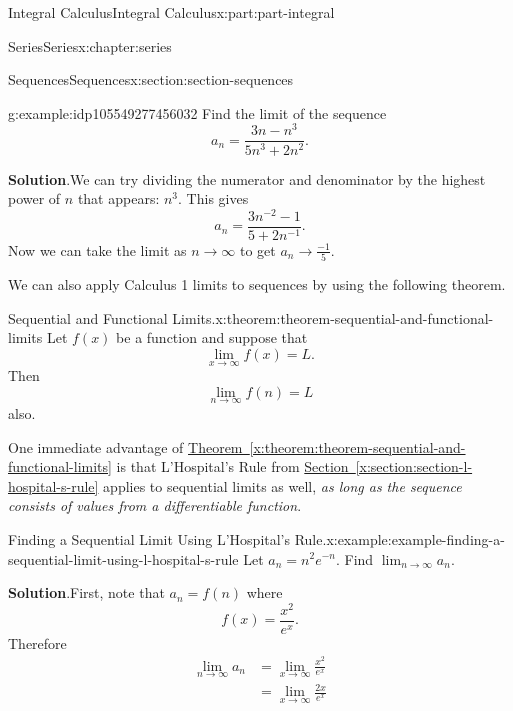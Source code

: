 \documentclass[twoside,10pt,]{book}
\newcommand{\blocktitlefont}{\relax}
\newcommand{\xreffont}{\relax}
\numberwithin{equation}{part}
\newcommand{\amp}{&}
\begin{document}
\begin{partptx}{Integral Calculus}{}{Integral Calculus}{}{}{x:part:part-integral}
\begin{chapterptx}{Series}{}{Series}{}{}{x:chapter:series}
\begin{sectionptx}{Sequences}{}{Sequences}{}{}{x:section:section-sequences}
\begin{example}{}{g:example:idp105549277456032}
Find the limit of the sequence%
\begin{equation*}
a_{n} = \frac{3n - n^{3}}{5n^{3} + 2n^{2}}.
\end{equation*}
%
\par\smallskip%
\noindent\textbf{\blocktitlefont Solution}.\hypertarget{g:solution:idp105549277456928}{}\quad{}We can try dividing the numerator and denominator by the highest power of \(n\) that appears: \(n^{3}\). This gives%
\begin{equation*}
a_{n} = \frac{3n^{-2} - 1}{5 + 2n^{-1}}\text{.}
\end{equation*}
Now we can take the limit as \(n\to\infty\) to get \(a_{n}\to\frac{-1}{5}\).%
\end{example}
We can also apply Calculus 1 limits to sequences by using the following theorem.%
\begin{theorem}{Sequential and Functional Limits.}{}{x:theorem:theorem-sequential-and-functional-limits}%
Let \(f(x)\) be a function and suppose that%
\begin{equation*}
\lim_{x\to\infty}f(x) = L\text{.}
\end{equation*}
Then%
\begin{equation*}
\lim_{n\to\infty}f(n) = L
\end{equation*}
also.%
\end{theorem}
One immediate advantage of \hyperref[x:theorem:theorem-sequential-and-functional-limits]{Theorem~{\xreffont\ref{x:theorem:theorem-sequential-and-functional-limits}}} is that L'Hospital's Rule from \hyperref[x:section:section-l-hospital-s-rule]{Section~{\xreffont\ref{x:section:section-l-hospital-s-rule}}} applies to sequential limits as well, \emph{as long as the sequence consists of values from a differentiable function}.%
\begin{example}{Finding a Sequential Limit Using L'Hospital's Rule.}{x:example:example-finding-a-sequential-limit-using-l-hospital-s-rule}%
Let \(a_{n} = n^{2}e^{-n}\). Find \(\lim_{n\to\infty}a_{n}\).%
\par\smallskip%
\noindent\textbf{\blocktitlefont Solution}.\hypertarget{g:solution:idp105549277464864}{}\quad{}First, note that \(a_{n} = f(n)\) where%
\begin{equation*}
f(x) = \frac{x^{2}}{e^{x}}\text{.}
\end{equation*}
Therefore%
%
\begin{align*}
\lim_{n\to\infty}a_{n} \amp = \lim_{x\to\infty}\frac{x^{2}}{e^{x}} \\
\amp = \lim_{x\to\infty}\frac{2x}{e^{x}} \\

\end{align*}
\end{example}
\end{sectionptx}
\end{chapterptx}
\end{partptx}
\end{document}

